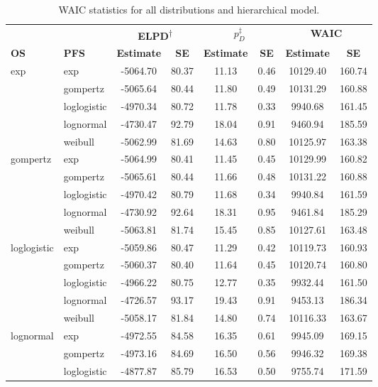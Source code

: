 \documentclass[AMA,STIX1COL]{WileyNJD-v2}
\begin{document}
\begin{table}[H]
\caption{WAIC statistics for all distributions and hierarchical model. \label{tab:waic_hier}}
\centering
\begin{tabular}{l l c c c c c c}
\toprule
\multicolumn{1}{l}{} & \multicolumn{1}{l}{} & \multicolumn{2}{c}{\textbf{ELPD\textsuperscript{$\dagger$}}} & \multicolumn{2}{c}{\textbf{$p_D^{\ddagger}$}} & \multicolumn{2}{c}{\textbf{WAIC}} \\
\cmidrule{3-4}\cmidrule{5-6}\cmidrule{7-8}
\textbf{OS} & \textbf{PFS} & \textbf{Estimate} & \textbf{SE} & \textbf{Estimate} & \textbf{SE} & \textbf{Estimate} & \textbf{SE}\\
\midrule
exp & exp & -5064.70 & 80.37 & 11.13 & 0.46 & 10129.40 & 160.74\\
 & gompertz & -5065.64 & 80.44 & 11.80 & 0.49 & 10131.29 & 160.88\\
 & loglogistic & -4970.34 & 80.72 & 11.78 & 0.33 & 9940.68 & 161.45\\
 & lognormal & -4730.47 & 92.79 & 18.04 & 0.91 & 9460.94 & 185.59\\
 & weibull & -5062.99 & 81.69 & 14.63 & 0.80 & 10125.97 & 163.38\\
gompertz & exp & -5064.99 & 80.41 & 11.45 & 0.45 & 10129.99 & 160.82\\
 & gompertz & -5065.61 & 80.44 & 11.66 & 0.48 & 10131.22 & 160.88\\
 & loglogistic & -4970.42 & 80.79 & 11.68 & 0.34 & 9940.84 & 161.59\\
 & lognormal & -4730.92 & 92.64 & 18.31 & 0.95 & 9461.84 & 185.29\\
 & weibull & -5063.81 & 81.74 & 15.45 & 0.85 & 10127.61 & 163.48\\
loglogistic & exp & -5059.86 & 80.47 & 11.29 & 0.42 & 10119.73 & 160.93\\
 & gompertz & -5060.37 & 80.40 & 11.64 & 0.45 & 10120.74 & 160.80\\
 & loglogistic & -4966.22 & 80.75 & 12.77 & 0.35 & 9932.44 & 161.50\\
 & lognormal & -4726.57 & 93.17 & 19.43 & 0.91 & 9453.13 & 186.34\\
 & weibull & -5058.17 & 81.84 & 14.80 & 0.74 & 10116.33 & 163.67\\
lognormal & exp & -4972.55 & 84.58 & 16.35 & 0.61 & 9945.09 & 169.15\\
 & gompertz & -4973.16 & 84.69 & 16.50 & 0.56 & 9946.32 & 169.38\\
 & loglogistic & -4877.87 & 85.79 & 16.53 & 0.50 & 9755.74 & 171.59\\

\end{tabular}
\end{table}
\end{document}
